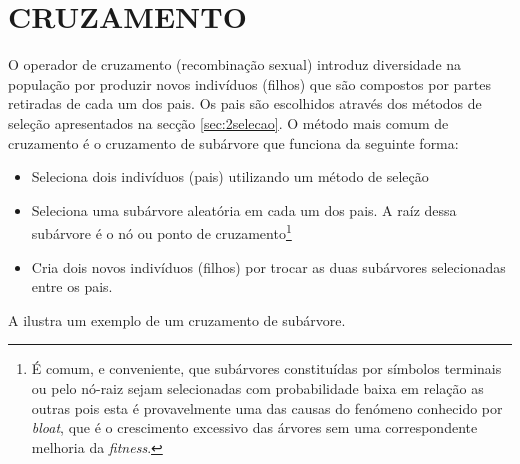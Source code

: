 \section{CRUZAMENTO}
\label{sec:2cruzamento}

O operador de cruzamento (recombinação sexual) introduz diversidade na população por produzir novos indivíduos (filhos) que são compostos por partes 
retiradas de cada um dos pais. Os pais são escolhidos através dos métodos de seleção apresentados na secção \ref{sec:2selecao}.
O método mais comum de cruzamento é o cruzamento de subárvore \citep{Koza1992} que funciona da seguinte forma:

\begin{itemize}
  \item {Seleciona dois indivíduos (pais) utilizando um método de seleção}
  \item {Seleciona uma subárvore aleatória em cada um dos pais. A raíz dessa subárvore é o nó ou ponto de cruzamento\footnote{É 
  comum, e conveniente, que subárvores constituídas por símbolos terminais ou pelo nó-raiz sejam selecionadas
  com probabilidade baixa em relação as outras pois esta é provavelmente uma das causas do fenómeno conhecido por \emph{bloat},
  que é o crescimento excessivo das árvores sem uma correspondente melhoria da \emph{fitness}.}}
  \item {Cria dois novos indivíduos (filhos) por trocar as duas subárvores selecionadas entre os pais.}
\end{itemize}

A  ilustra um exemplo de um cruzamento de subárvore.


